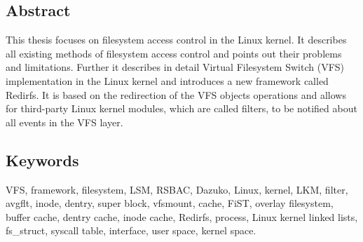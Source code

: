 \begin{titlepage}
	\subsection*{Abstract}
	This thesis focuses on filesystem access control in the Linux kernel. It
	describes all existing methods of filesystem access control and points
	out their problems and limitations. Further it describes in detail Virtual
	Filesystem Switch (VFS) implementation in the Linux kernel and introduces a
	new framework called Redirfs. It is based on the redirection of the VFS
	objects operations and allows for third-party Linux kernel modules, which are
	called filters, to be notified about all events in the VFS layer.

	\vspace{3cm}
	\subsection*{Keywords}
	VFS, framework, filesystem, LSM, RSBAC, Dazuko, Linux, kernel, LKM, filter,
	avgflt, inode, dentry, super block, vfsmount, cache, FiST, overlay filesystem,
	buffer cache, dentry cache, inode cache, Redirfs, process, Linux kernel linked
	lists, fs\_struct, syscall table, interface, user space, kernel space.
\end{titlepage}
